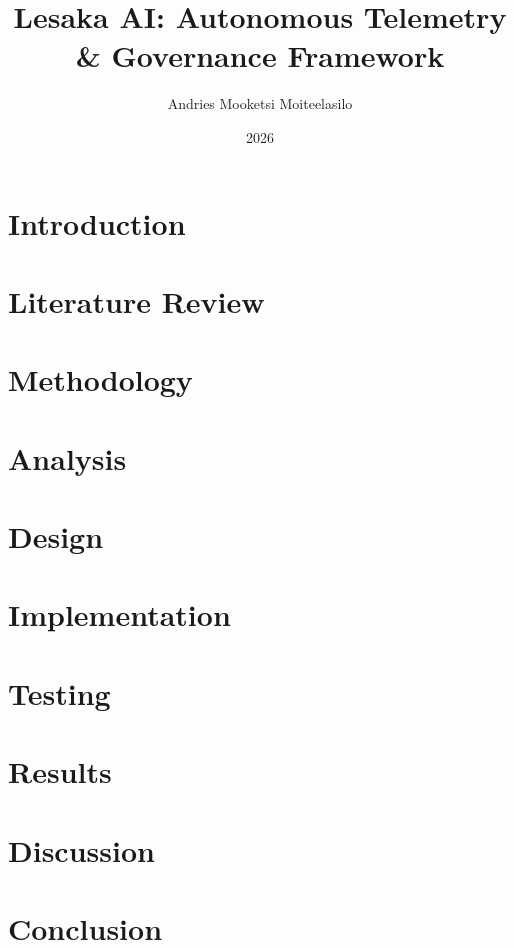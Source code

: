 \documentclass[12pt,a4paper]{report}
\title{Lesaka AI: Autonomous Telemetry \& Governance Framework}
\author{Andries Mooketsi Moiteelasilo}
\date{2026}
\begin{document}





\tableofcontents
\listoffigures
\listoftables
\lstlistoflistings

\chapter{Introduction}


\chapter{Literature Review}


\chapter{Methodology}


\chapter{Analysis}


\chapter{Design}


\chapter{Implementation}


\chapter{Testing}


\chapter{Results}


\chapter{Discussion}


\chapter{Conclusion}




\end{document}
